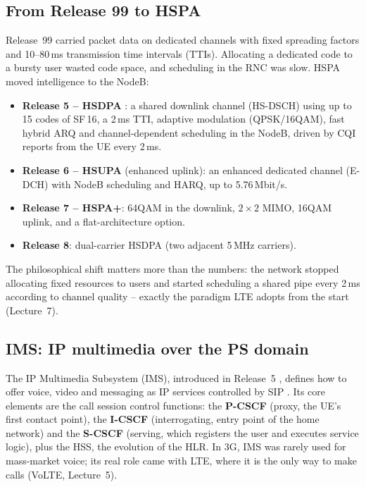 \documentclass[11pt,a4paper]{article}
\begin{document}
\subsection{From Release 99 to HSPA}
Release~99 carried packet data on dedicated channels with fixed spreading factors and 10--80\,ms
transmission time intervals (TTIs). Allocating a dedicated code to a bursty user wasted code
space, and scheduling in the RNC was slow. HSPA moved intelligence to the NodeB:
\begin{itemize}
  \item \textbf{Release 5 -- HSDPA} \cite{ts25308}: a shared downlink channel (HS-DSCH) using up
        to 15 codes of SF\,16, a 2\,ms TTI, adaptive modulation (QPSK/16QAM), fast hybrid ARQ and
        channel-dependent scheduling in the NodeB, driven by CQI reports from the UE every 2\,ms.
  \item \textbf{Release 6 -- HSUPA} (enhanced uplink): an enhanced dedicated channel (E-DCH)
        with NodeB scheduling and HARQ, up to 5.76\,Mbit/s.
  \item \textbf{Release 7 -- HSPA+}: 64QAM in the downlink, $2\times2$ MIMO, 16QAM uplink, and
        a flat-architecture option.
  \item \textbf{Release 8}: dual-carrier HSDPA (two adjacent 5\,MHz carriers).
\end{itemize}
The philosophical shift matters more than the numbers: the network stopped allocating fixed
resources to users and started scheduling a shared pipe every 2\,ms according to channel
quality -- exactly the paradigm LTE adopts from the start (Lecture~7).

\subsection{IMS: IP multimedia over the PS domain}
The IP Multimedia Subsystem (IMS), introduced in Release~5 \cite{ts23228}, defines how to
offer voice, video and messaging as IP services controlled by SIP \cite{rfc3261}. Its core
elements are the call session control functions: the \textbf{P-CSCF} (proxy, the UE's first
contact point), the \textbf{I-CSCF} (interrogating, entry point of the home network) and the
\textbf{S-CSCF} (serving, which registers the user and executes service logic), plus the HSS,
the evolution of the HLR. In 3G, IMS was rarely used for mass-market voice; its real role came
with LTE, where it is the only way to make calls (VoLTE, Lecture~5).

\end{document}
